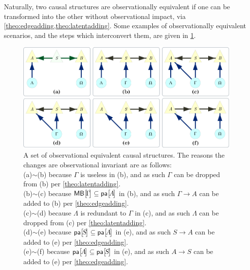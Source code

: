 {\clearpage
Naturally, two causal structures are observationally equivalent if one can be transformed into the other without observational impact, via \cref{theo:edgeadding,theo:latentadding}. Some examples of observationally equivalent scenarios, and the steps which interconvert them, are given in \cref{fig:equivalences}.
\begin{figure}[hb]
\centering
\includegraphics[width=\linewidth]{ObservationalEquivalencesExamples.pdf}
\caption{A set of observational equivalent causal structures. The reasons the changes are observational invariant are as follows: \\
(a)$\sim$(b) because $\Gamma$ is useless in (b), and as such $\Gamma$ can be dropped from (b) per \cref{theo:latentadding}.\\
(b)$\sim$(c) because $\NamedFunction{MB}{\!\Gamma\!}\subseteq\NamedFunction{pa}{\!A\!}$ in (b), and as such $\Gamma\to A$ can be added to (b) per \cref{theo:edgeadding}.\\
(c)$\sim$(d) because $\Lambda$ is redundant to $\Gamma$ in (c), and as such $\Lambda$ can be dropped from (c) per \cref{theo:latentadding}.\\
(d)$\sim$(e) because $\NamedFunction{pa}{\!S\!}\subseteq\NamedFunction{pa}{\!A\!}$ in (e), and as such $S\to A$ can be added to (e) per \cref{theo:edgeadding}.\\
(e)$\sim$(f) because $\NamedFunction{pa}{\!A\!}\subseteq\NamedFunction{pa}{\!S\!}$ in (e), and as such $A\to S$ can be added to (e) per \cref{theo:edgeadding}.
}\label{fig:equivalences}
\end{figure}


}
